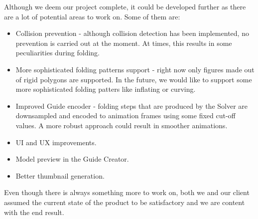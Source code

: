 Although we deem our project complete, it could be developed further as there are a lot of potential areas to work on.
Some of them are:

\begin{itemize}
	\item Collision prevention - although collision detection has been implemented, no prevention is carried out at the moment. At times, this results in some peculiarities during folding.
	\item More sophisticated folding patterns support - right now only figures made out of rigid polygons are supported. In the future, we would like to support some more sophisticated folding patters like inflating or curving.
	\item Improved Guide encoder - folding steps that are produced by the Solver are downsampled and encoded to animation frames using some fixed cut-off values. A more robust approach could result in smoother animations.
	\item UI and UX improvements.
	\item Model preview in the Guide Creator.
	\item Better thumbnail generation.
\end{itemize}

Even though there is always something more to work on,
both we and our client assumed the current state of the product to be
satisfactory and we are content with the end result.

